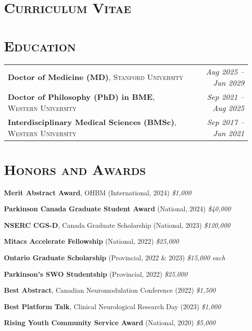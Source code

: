 \section*{\textsc{Curriculum Vitae}}

\section*{\textsc{Education}} \noindent\hrulefill \vspace{0.5em}
\begin{tabularx}{\textwidth}{@{}X r@{}}
\textbf{Doctor of Medicine (MD)}, \textsc{Stanford University} & \textit{Aug 2025 – Jun 2029} \\
\textbf{Doctor of Philosophy (PhD) in BME}, \textsc{Western University} & \textit{Sep 2021 – Aug 2025} \\
\textbf{Interdisciplinary Medical Sciences (BMSc)}, \textsc{Western University} & \textit{Sep 2017 – Jun 2021} \\
\end{tabularx}

\vspace{0.5em}
\section*{\textsc{Honors and Awards}} \noindent\hrulefill \vspace{0.5em}
  \item \textbf{Merit Abstract Award}, OHBM (International, 2024) \hfill \textit{\$1,000}
  \item \textbf{Parkinson Canada Graduate Student Award} (National, 2024) \hfill \textit{\$40,000}
  \item \textbf{NSERC CGS-D}, Canada Graduate Scholarship (National, 2023) \hfill \textit{\$120,000}
  \item \textbf{Mitacs Accelerate Fellowship} (National, 2022) \hfill \textit{\$25,000}
  \item \textbf{Ontario Graduate Scholarship} (Provincial, 2022 \& 2023) \hfill \textit{\$15,000 each}
  \item \textbf{Parkinson’s SWO Studentship} (Provincial, 2022) \hfill \textit{\$25,000}
  \item \textbf{Best Abstract}, Canadian Neuromodulation Conference (2022) \hfill \textit{\$1,500}
  \item \textbf{Best Platform Talk}, Clinical Neurological Research Day (2023) \hfill \textit{\$1,000}
  \item \textbf{Rising Youth Community Service Award} (National, 2020) \hfill \textit{\$5,000}


